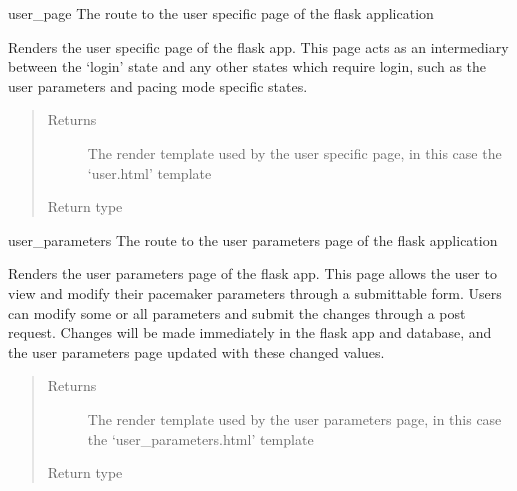 \documentclass[letterpaper,10pt,english]{sphinxmanual}
\begin{document}

\begin{fulllineitems}
\label{\detokenize{index:app.user_page}}
user\_page The route to the user specific page of the flask application

Renders the user specific page of the flask app. This page acts as an intermediary
between the ‘login’ state and any other states which require login, such as the
user parameters and pacing mode specific states.
\begin{quote}\begin{description}
\item[{Returns}] \leavevmode
The render template used by the user specific page, in this case the ‘user.html’ template

\item[{Return type}] \leavevmode
{}

\end{description}\end{quote}

\end{fulllineitems}


\begin{fulllineitems}
\label{\detokenize{index:app.user_parameters}}
user\_parameters The route to the user parameters page of the flask application

Renders the user parameters page of the flask app. This page allows the user to
view and modify their pacemaker parameters through a submittable form. Users can
modify some or all parameters and submit the changes through a post request. Changes
will be made immediately in the flask app and database, and the user parameters page
updated with these changed values.
\begin{quote}\begin{description}
\item[{Returns}] \leavevmode
The render template used by the user parameters page, in this case the ‘user\_parameters.html’ template

\item[{Return type}] \leavevmode
{}

\end{description}\end{quote}

\end{fulllineitems}
\end{document}

